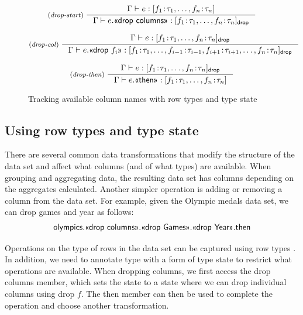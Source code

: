 \documentclass[a4paper,UKenglish]{lipics-v2016}
\theoremstyle{plain}
\theoremstyle{definition}
\newcommand{\ident}[1]{\textnormal{\sffamily #1}}
\newcommand{\qident}[1]{\textnormal{\sffamily \guillemotleft #1\guillemotright}}
\begin{document}
\begin{figure}

\begin{equation*}
\inference[(\emph{drop-start})~]
  {\Gamma \vdash e : [f_1\!:\!\tau_1, \ldots, f_n\!:\!\tau_n]}
  {\Gamma \vdash e.\qident{drop columns}: [f_1\!:\!\tau_1, \ldots, f_n\!:\!\tau_n]_{\ident{drop}}}
\end{equation*}

\begin{equation*}
\inference[(\emph{drop-col})~]
  {\Gamma \vdash e : [f_1\!:\!\tau_1, \ldots, f_n\!:\!\tau_n]_{\ident{drop}}}
  {\Gamma \vdash e.\qident{drop~$f_i$}: [f_1\!:\!\tau_1, \ldots, f_{i-1}\!:\!\tau_{i-1}, f_{i+1}\!:\!\tau_{i+1}, \ldots, f_n\!:\!\tau_n ]_{\ident{drop}}}
\end{equation*}

\begin{equation*}
\inference[(\emph{drop-then})~]
  {\Gamma \vdash e : [f_1\!:\!\tau_1, \ldots, f_n\!:\!\tau_n]_{\ident{drop}}}
  {\Gamma \vdash e.\qident{then}: [f_1\!:\!\tau_1, \ldots, f_n\!:\!\tau_n]}
\end{equation*}


\caption{Tracking available column names with row types and type state}
\label{fig:fancy-types}
\end{figure}


\subsection{Using row types and type state}
\label{sec:columns-row}

There are several common data transformations that modify the structure of the data set and affect
what columns (and of what types) are available. When grouping and aggregating data, the resulting
data set has columns depending on the aggregates calculated. Another simpler operation is adding
or removing a column from the data set. For example, given the Olympic medals data set, we can 
drop games and year as follows:
%
\begin{equation*}
  \begin{array}{l}
    \ident{olympics}.\qident{drop columns}.\qident{drop Games}.\qident{drop Year}.\ident{then}
  \end{array}
\end{equation*}

\noindent
Operations on the type of rows in the data set can be captured using row types \cite{rowtypes}. 
In addition, we need to annotate type with a form of type state \cite{typestate} to restrict what operations are available. 
When dropping columns, we first access the \qident{drop columns} member, which sets the state to
a state where we can drop individual columns using \qident{drop $f$}. The \ident{then} member can 
then be used to complete the operation and choose another transformation.
\end{document}
